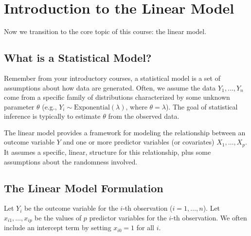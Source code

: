 \documentclass[11pt]{article}
\theoremstyle{definition}
\begin{document}
\section{Introduction to the Linear Model}
\label{sec:linear_model}

Now we transition to the core topic of this course: the linear model.

\subsection{What is a Statistical Model?}
\label{subsec:stat_model}

Remember from your introductory courses, a statistical model is a set of assumptions about how data are generated. Often, we assume the data $Y_1, \ldots, Y_n$ come from a specific family of distributions characterized by some unknown parameter $\theta$ (e.g., $Y_i \sim \text{Exponential}(\lambda)$, where $\theta=\lambda$). The goal of statistical inference is typically to estimate $\theta$ from the observed data.

The linear model provides a framework for modeling the relationship between an outcome variable $Y$ and one or more predictor variables (or covariates) $X_1, \ldots, X_p$. It assumes a specific, linear, structure for this relationship, plus some assumptions about the randomness involved.

\subsection{The Linear Model Formulation}
\label{subsec:lm_formulation}

Let $Y_i$ be the outcome variable for the $i$-th observation ($i=1, \ldots, n$).
Let $x_{i1}, \ldots, x_{ip}$ be the values of $p$ predictor variables for the $i$-th observation. We often include an intercept term by setting $x_{i0}=1$ for all $i$.
\end{document}
